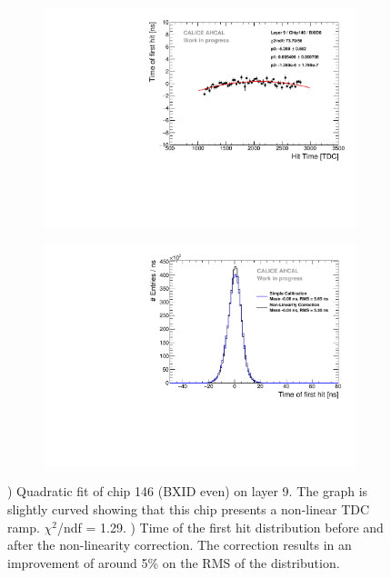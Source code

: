 \documentclass{JINST}
\begin{document}
\begin{figure}[htbp!]
  \begin{subfigure}[t]{0.49\textwidth}
    \centering
    \includegraphics[width=1\linewidth]{fig/LinearityCorrection_Module09_Chip146_BXID0.pdf}
    \caption{} \label{fig:NLCorr}
  \end{subfigure}
  \hfill
  \begin{subfigure}[t]{0.49\textwidth}
    \centering
    \includegraphics[width=1\linewidth]{fig/Timing_AHCAL_LinCorrection.pdf}
    \caption{} \label{fig:TimingNLCorr}
  \end{subfigure}
  \caption{) Quadratic fit of chip 146 (BXID even) on layer 9. The graph is slightly curved showing that this chip presents a non-linear TDC ramp. $\chi^{2}$/ndf = 1.29. ) Time of the first hit distribution before and after the non-linearity correction. The correction results in an improvement of around 5\% on the RMS of the distribution.}
\end{figure}
\end{document}
